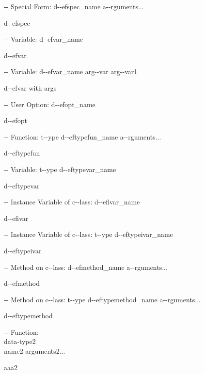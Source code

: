 \documentclass{book}
\begin{document}
\hbox{}{-}{-} Special Form: d{-}{-}efspec\_name a{-}{-}rguments...


%
d{-}{-}efspec

\hbox{}{-}{-} Variable: d{-}{-}efvar\_name


%
d{-}{-}efvar

\hbox{}{-}{-} Variable: d{-}{-}efvar\_name arg{-}{-}var arg{-}{-}var1


%
d{-}{-}efvar with args

\hbox{}{-}{-} User Option: d{-}{-}efopt\_name


%
d{-}{-}efopt

\hbox{}{-}{-} Function: t{-}{-}ype d{-}{-}eftypefun\_name a{-}{-}rguments...


%
d{-}{-}eftypefun

\hbox{}{-}{-} Variable: t{-}{-}ype d{-}{-}eftypevar\_name


%
d{-}{-}eftypevar

\hbox{}{-}{-} Instance Variable of c{-}{-}lass: d{-}{-}efivar\_name


%
d{-}{-}efivar

\hbox{}{-}{-} Instance Variable of c{-}{-}lass: t{-}{-}ype d{-}{-}eftypeivar\_name


%
d{-}{-}eftypeivar

\hbox{}{-}{-} Method on c{-}{-}lass: d{-}{-}efmethod\_name a{-}{-}rguments...


%
d{-}{-}efmethod

\hbox{}{-}{-} Method on c{-}{-}lass: t{-}{-}ype d{-}{-}eftypemethod\_name a{-}{-}rguments...


%
d{-}{-}eftypemethod


\hbox{}{-}{-} Function:\leavevmode{}\\data-type2\leavevmode{}\\name2 arguments2...


%
aaa2
\end{document}
